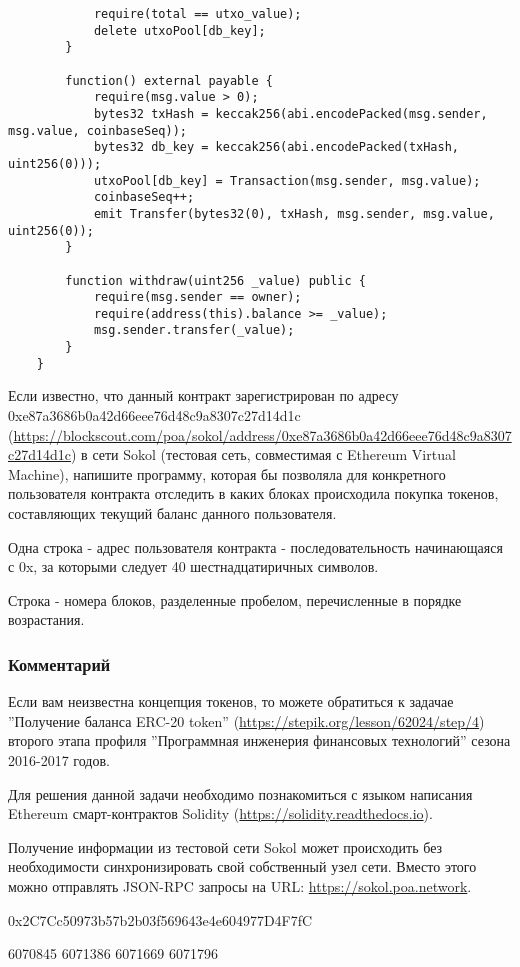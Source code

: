 \begin{verbatim}
            require(total == utxo_value);
            delete utxoPool[db_key];
        }
       
        function() external payable {
            require(msg.value > 0);
            bytes32 txHash = keccak256(abi.encodePacked(msg.sender, msg.value, coinbaseSeq));
            bytes32 db_key = keccak256(abi.encodePacked(txHash, uint256(0)));
            utxoPool[db_key] = Transaction(msg.sender, msg.value);
            coinbaseSeq++;
            emit Transfer(bytes32(0), txHash, msg.sender, msg.value, uint256(0));
        }
        
        function withdraw(uint256 _value) public {
            require(msg.sender == owner);
            require(address(this).balance >= _value);
            msg.sender.transfer(_value);
        }
    }
\end{verbatim}

Если известно, что данный контракт зарегистрирован по адресу\\ 0xe87a3686b0a42d66eee76d48c9a8307c27d14d1c (\url{https://blockscout.com/poa/sokol/address/0xe87a3686b0a42d66eee76d48c9a8307c27d14d1c}) 
в сети Sokol (тестовая сеть, совместимая с Ethereum Virtual Machine), 
напишите программу, которая бы позволяла для конкретного пользователя контракта отследить в каких блоках происходила покупка токенов, составляющих текущий баланс данного пользователя.


Одна строка - адрес пользователя контракта - последовательность начинающаяся с 0x, за которыми следует 40 шестнадцатиричных символов.

\outputfmtSection

Строка - номера блоков, разделенные пробелом, перечисленные в порядке возрастания.

\subsubsection*{Комментарий}

Если вам неизвестна концепция токенов, то можете обратиться к задачае ''Получение баланса ERC-20 token'' (\url{https://stepik.org/lesson/62024/step/4}) второго этапа профиля ''Программная инженерия финансовых технологий'' сезона 2016-2017 годов.

Для решения данной задачи необходимо познакомиться с языком написания Ethereum смарт-контрактов Solidity (\url{https://solidity.readthedocs.io}).

Получение информации из тестовой сети Sokol может происходить без необходимости синхронизировать свой собственный узел сети. Вместо этого можно отправлять JSON-RPC запросы на URL: \url{https://sokol.poa.network}.

\begin{myverbbox}[\small]{\vinput} 
    0x2C7Cc50973b57b2b03f569643e4e604977D4F7fC
\end{myverbbox}
\begin{myverbbox}[\small]{\voutput}
    6070845 6071386 6071669 6071796
\end{myverbbox}

